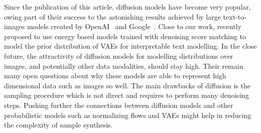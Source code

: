 Since the publication of this article, diffusion models have become very popular, owing part of their success to the astonishing results achieved by large text-to-images models created by OpenAI~\citep[$\text{DALL}\cdot\text{E} 2$][]{ramesh2022hierarchical} and Google~\citep[Imagen][]{saharia2022photorealistic}. Close to our work, \citet{yu2022latent} recently proposed to use energy based models trained with denoising score matching to model the prior distribution of VAEs for interpretable text modelling. In the close future, the attractivity of diffusion models for modelling distributions over images, and potentially other data modalities, should stay high. Their remain many open questions about why these models are able to represent high dimensional data such as images so well. The main drawbacks of diffusion is the sampling procedure which is not direct and requires to perform many denoising steps. Pushing further the connections between diffusion models and other probabilistic models such as normalizing flows and VAEs might help in reducing the complexity of sample synthesis.

